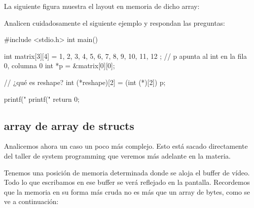 \documentclass[]{scrartcl}
\begin{document}
La siguiente figura muestra el layout en memoria de dicho array:

\begin{center}
  \noindent {}
  \label{fig:matrix}
\end{center}

\begin{exbox}
Analicen cuidadosamente el siguiente ejemplo y respondan las preguntas:
\begin{cbox}[]{}
  #include <stdio.h>
  int main() {
      int matrix[3][4] = {
          {1, 2, 3, 4},
          {5, 6, 7, 8},
          {9, 10, 11, 12}
          };
      // p apunta al int en la fila 0, columna 0
      int *p = &matrix[0][0]; 

      // ¿qué es reshape?
      int (*reshape)[2] = (int (*)[2]) p; 

      printf("%
      printf("%
      return 0;
  }
\end{cbox}
\end{exbox}

\subsection*{array de array de structs}

Analicemos ahora un caso un poco más complejo. Esto está sacado directamente del taller de system programming que veremos más adelante en la materia. 

Tenemos una posición de memoria determinada donde se aloja el buffer de vídeo. Todo lo que escribamos en ese buffer se verá reflejado en la pantalla. Recordemos que la memoria en su forma más cruda no es más que un array de bytes, como se ve a continuación:
\end{document}
